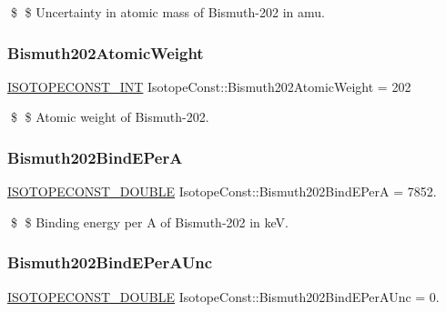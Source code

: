 \$ \$ Uncertainty in atomic mass of Bismuth-\/202 in amu. \mbox{\label{group___isotope_const-_bismuth-_bi202_ga935d186044b8740c96069c34e0f82cb6}} 
\subsubsection{\texorpdfstring{Bismuth202\+Atomic\+Weight}{Bismuth202AtomicWeight}}
{\footnotesize\ttfamily \mbox{\hyperlink{group___isotope_const-_macros_ga5f18360b3e99483a35c32d789e62621c}{I\+S\+O\+T\+O\+P\+E\+C\+O\+N\+S\+T\+\_\+\+I\+NT}} Isotope\+Const\+::\+Bismuth202\+Atomic\+Weight = 202}

\$ \$ Atomic weight of Bismuth-\/202. \mbox{\label{group___isotope_const-_bismuth-_bi202_gae4952972b6d0138dbd34d7687426f979}} 
\subsubsection{\texorpdfstring{Bismuth202\+Bind\+E\+PerA}{Bismuth202BindEPerA}}
{\footnotesize\ttfamily \mbox{\hyperlink{group___isotope_const-_macros_ga8f45a7272ce02c0b4c65c44636ed719a}{I\+S\+O\+T\+O\+P\+E\+C\+O\+N\+S\+T\+\_\+\+D\+O\+U\+B\+LE}} Isotope\+Const\+::\+Bismuth202\+Bind\+E\+PerA = 7852.}

\$ \$ Binding energy per A of Bismuth-\/202 in keV. \mbox{\label{group___isotope_const-_bismuth-_bi202_gac6dc2590c9222f727465e40ea6c0e8fe}} 
\subsubsection{\texorpdfstring{Bismuth202\+Bind\+E\+Per\+A\+Unc}{Bismuth202BindEPerAUnc}}
{\footnotesize\ttfamily \mbox{\hyperlink{group___isotope_const-_macros_ga8f45a7272ce02c0b4c65c44636ed719a}{I\+S\+O\+T\+O\+P\+E\+C\+O\+N\+S\+T\+\_\+\+D\+O\+U\+B\+LE}} Isotope\+Const\+::\+Bismuth202\+Bind\+E\+Per\+A\+Unc = 0.}

